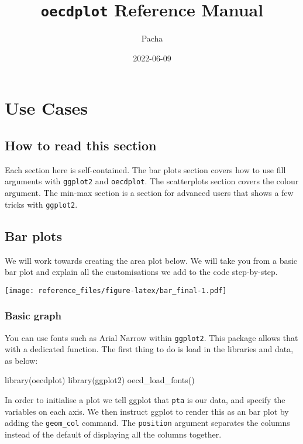 \documentclass[
]{article}
\title{\texttt{oecdplot} Reference Manual}
\author{Pacha}
\date{2022-06-09}
\newenvironment{Shaded}{\begin{snugshade}}{\end{snugshade}}
\newcommand{\FunctionTok}[1]{\textcolor[rgb]{0.00,0.00,0.00}{#1}}
\newcommand{\NormalTok}[1]{#1}
\begin{document}
\maketitle

\hypertarget{use-cases}{%
\section{Use Cases}\label{use-cases}}

\hypertarget{how-to-read-this-section}{%
\subsection{How to read this section}\label{how-to-read-this-section}}

Each section here is self-contained. The bar plots section covers how to
use fill arguments with \texttt{ggplot2} and \texttt{oecdplot}. The
scatterplots section covers the colour argument. The min-max section is
a section for advanced users that shows a few tricks with
\texttt{ggplot2}.

\hypertarget{bar-plots}{%
\subsection{Bar plots}\label{bar-plots}}

We will work towards creating the area plot below. We will take you from
a basic bar plot and explain all the customisations we add to the code
step-by-step.

\texttt{[image: reference\_files/figure-latex/bar\_final-1.pdf]}

\hypertarget{basic-graph}{%
\subsubsection{Basic graph}\label{basic-graph}}

You can use fonts such as Arial Narrow within \texttt{ggplot2}. This
package allows that with a dedicated function. The first thing to do is
load in the libraries and data, as below:

\begin{Shaded}
\begin{Highlighting}[]
\FunctionTok{library}\NormalTok{(oecdplot)}
\FunctionTok{library}\NormalTok{(ggplot2)}
\FunctionTok{oecd\_load\_fonts}\NormalTok{()}
\end{Highlighting}
\end{Shaded}

In order to initialise a plot we tell ggplot that \texttt{pta} is our
data, and specify the variables on each axis. We then instruct ggplot to
render this as an bar plot by adding the \texttt{geom\_col} command. The
\texttt{position} argument separates the columns instead of the default
of displaying all the columns together.
\end{document}
